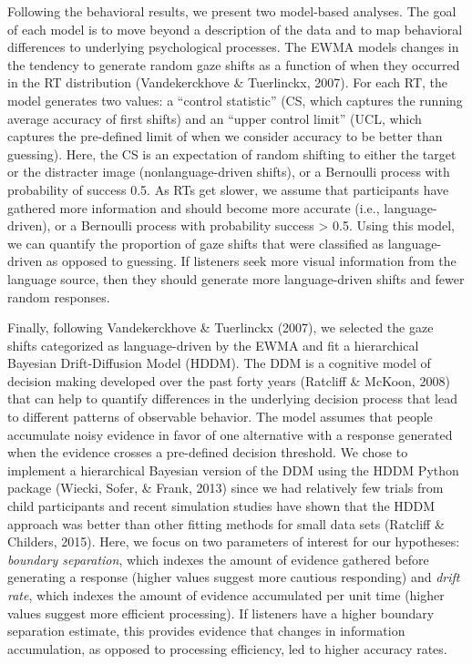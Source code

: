 \documentclass[oneside]{report}
\begin{document}
Following the behavioral results, we present two model-based analyses.
The goal of each model is to move beyond a description of the data and
to map behavioral differences to underlying psychological processes. The
EWMA models changes in the tendency to generate random gaze shifts as a
function of when they occurred in the RT distribution (Vandekerckhove \&
Tuerlinckx, 2007). For each RT, the model generates two values: a
``control statistic'' (CS, which captures the running average accuracy
of first shifts) and an ``upper control limit'' (UCL, which captures the
pre-defined limit of when we consider accuracy to be better than
guessing). Here, the CS is an expectation of random shifting to either
the target or the distracter image (nonlanguage-driven shifts), or a
Bernoulli process with probability of success 0.5. As RTs get slower, we
assume that participants have gathered more information and should
become more accurate (i.e., language-driven), or a Bernoulli process
with probability success \textgreater{} 0.5. Using this model, we can
quantify the proportion of gaze shifts that were classified as
language-driven as opposed to guessing. If listeners seek more visual
information from the language source, then they should generate more
language-driven shifts and fewer random responses.

Finally, following Vandekerckhove \& Tuerlinckx (2007), we selected the
gaze shifts categorized as language-driven by the EWMA and fit a
hierarchical Bayesian Drift-Diffusion Model (HDDM). The DDM is a
cognitive model of decision making developed over the past forty years
(Ratcliff \& McKoon, 2008) that can help to quantify differences in the
underlying decision process that lead to different patterns of
observable behavior. The model assumes that people accumulate noisy
evidence in favor of one alternative with a response generated when the
evidence crosses a pre-defined decision threshold. We chose to implement
a hierarchical Bayesian version of the DDM using the HDDM Python package
(Wiecki, Sofer, \& Frank, 2013) since we had relatively few trials from
child participants and recent simulation studies have shown that the
HDDM approach was better than other fitting methods for small data sets
(Ratcliff \& Childers, 2015). Here, we focus on two parameters of
interest for our hypotheses: \emph{boundary separation}, which indexes
the amount of evidence gathered before generating a response (higher
values suggest more cautious responding) and \emph{drift rate}, which
indexes the amount of evidence accumulated per unit time (higher values
suggest more efficient processing). If listeners have a higher boundary
separation estimate, this provides evidence that changes in information
accumulation, as opposed to processing efficiency, led to higher
accuracy rates.
\end{document}
